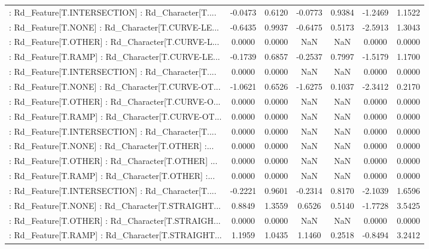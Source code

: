 \begin{longtable}{p{4cm}cccccc}
 : Rd\_Feature[T.INTERSECTION] : Rd\_Character[T.... & -0.0473 &    0.6120 & -0.0773 &       0.9384 & -1.2469 &  1.1522 \\
 : Rd\_Feature[T.NONE] : Rd\_Character[T.CURVE-LE... & -0.6435 &    0.9937 & -0.6475 &       0.5173 & -2.5913 &  1.3043 \\
 : Rd\_Feature[T.OTHER] : Rd\_Character[T.CURVE-L... &  0.0000 &    0.0000 &     NaN &          NaN &  0.0000 &  0.0000 \\
 : Rd\_Feature[T.RAMP] : Rd\_Character[T.CURVE-LE... & -0.1739 &    0.6857 & -0.2537 &       0.7997 & -1.5179 &  1.1700 \\
 : Rd\_Feature[T.INTERSECTION] : Rd\_Character[T.... &  0.0000 &    0.0000 &     NaN &          NaN &  0.0000 &  0.0000 \\
 : Rd\_Feature[T.NONE] : Rd\_Character[T.CURVE-OT... & -1.0621 &    0.6526 & -1.6275 &       0.1037 & -2.3412 &  0.2170 \\
 : Rd\_Feature[T.OTHER] : Rd\_Character[T.CURVE-O... &  0.0000 &    0.0000 &     NaN &          NaN &  0.0000 &  0.0000 \\
 : Rd\_Feature[T.RAMP] : Rd\_Character[T.CURVE-OT... &  0.0000 &    0.0000 &     NaN &          NaN &  0.0000 &  0.0000 \\
 : Rd\_Feature[T.INTERSECTION] : Rd\_Character[T.... &  0.0000 &    0.0000 &     NaN &          NaN &  0.0000 &  0.0000 \\
 : Rd\_Feature[T.NONE] : Rd\_Character[T.OTHER] :... &  0.0000 &    0.0000 &     NaN &          NaN &  0.0000 &  0.0000 \\
 : Rd\_Feature[T.OTHER] : Rd\_Character[T.OTHER] ... &  0.0000 &    0.0000 &     NaN &          NaN &  0.0000 &  0.0000 \\
 : Rd\_Feature[T.RAMP] : Rd\_Character[T.OTHER] :... &  0.0000 &    0.0000 &     NaN &          NaN &  0.0000 &  0.0000 \\
 : Rd\_Feature[T.INTERSECTION] : Rd\_Character[T.... & -0.2221 &    0.9601 & -0.2314 &       0.8170 & -2.1039 &  1.6596 \\
 : Rd\_Feature[T.NONE] : Rd\_Character[T.STRAIGHT... &  0.8849 &    1.3559 &  0.6526 &       0.5140 & -1.7728 &  3.5425 \\
 : Rd\_Feature[T.OTHER] : Rd\_Character[T.STRAIGH... &  0.0000 &    0.0000 &     NaN &          NaN &  0.0000 &  0.0000 \\
 : Rd\_Feature[T.RAMP] : Rd\_Character[T.STRAIGHT... &  1.1959 &    1.0435 &  1.1460 &       0.2518 & -0.8494 &  3.2412 \\

\end{longtable}
